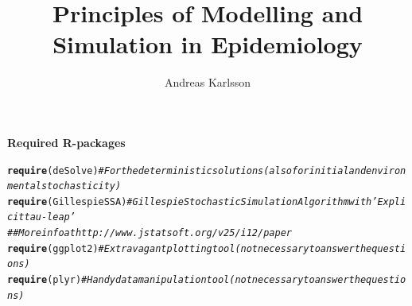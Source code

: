\documentclass{article}\usepackage[]{graphicx}\usepackage[]{color}
\makeatletter
\newcommand{\hlcom}[1]{\textcolor[rgb]{0.678,0.584,0.686}{\textit{#1}}}%
\newcommand{\hlstd}[1]{\textcolor[rgb]{0.345,0.345,0.345}{#1}}%
\newcommand{\hlkwd}[1]{\textcolor[rgb]{0.737,0.353,0.396}{\textbf{#1}}}%
\newenvironment{kframe}{%
 \def\at@end@of@kframe{}%
 \ifinner\ifhmode%
  \def\at@end@of@kframe{\end{minipage}}%
  \begin{minipage}{\columnwidth}%
 \fi\fi%
 \def\FrameCommand##1{\hskip\@totalleftmargin \hskip-\fboxsep
 \colorbox{shadecolor}{##1}\hskip-\fboxsep
     \hskip-\linewidth \hskip-\@totalleftmargin \hskip\columnwidth}%
 \MakeFramed {\advance\hsize-\width
   \@totalleftmargin\z@ \linewidth\hsize
   \@setminipage}}%
 {\par\unskip\endMakeFramed%
 \at@end@of@kframe}
\newenvironment{knitrout}{}{} %
\makeatother
\begin{document}




\title{Principles of Modelling and Simulation in Epidemiology}
\author{Andreas Karlsson}
\maketitle


\bf{Required R-packages}
\begin{knitrout}
\color{fgcolor}\begin{kframe}
\begin{alltt}
\hlkwd{require}\hlstd{(deSolve)}  \hlcom{#For the deterministic solutions (also for initial and environmental stochasticity)}
\hlkwd{require}\hlstd{(GillespieSSA)}  \hlcom{#Gillespie Stochastic Simulation Algorithm with 'Explicit tau-leap'}
\hlcom{## More info at http://www.jstatsoft.org/v25/i12/paper}
\hlkwd{require}\hlstd{(ggplot2)}  \hlcom{#Extravagant plotting tool (not necessary to answer the questions)}
\hlkwd{require}\hlstd{(plyr)}  \hlcom{#Handy data manipulation tool (not necessary to answer the questions)}
\end{alltt}
\end{kframe}
\end{knitrout}
\end{document}
